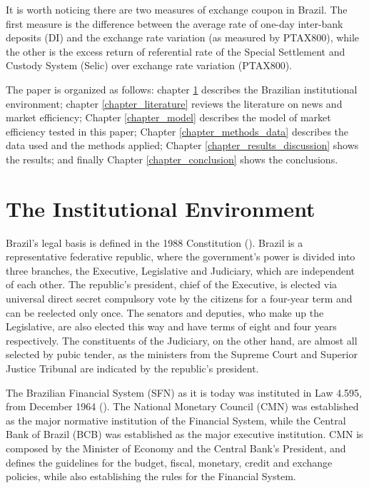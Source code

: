 \documentclass[cic,tc, english]{iiufrgs}
\begin{document}
    It is worth noticing there are two measures of exchange coupon in Brazil. The first measure is the difference between the average rate of one-day inter-bank deposits (DI) and the exchange rate variation (as measured by PTAX800), while the other is the excess return of referential rate of the Special Settlement and Custody System (Selic) over exchange rate variation (PTAX800). 
  
    The paper is organized as follows: chapter \ref{chapter_institutional} describes the Brazilian institutional environment; chapter \ref{chapter_literature} reviews the literature on news and market efficiency; Chapter \ref{chapter_model} describes the model of market efficiency tested in this paper; Chapter \ref{chapter_methods_data} describes the data used and the methods applied; Chapter \ref{chapter_results_discussion} shows the results; and finally Chapter \ref{chapter_conclusion} shows the conclusions.

\chapter{The Institutional Environment} \label{chapter_institutional}

    Brazil's legal basis is defined in the 1988 Constitution (\citet{constituicao}). Brazil is a representative federative republic, where the government's power is divided into three branches, the Executive, Legislative and Judiciary, which are independent of each other. The republic's president, chief of the Executive, is elected via universal direct secret compulsory vote by the citizens for a four-year term and can be reelected only once. The senators and deputies, who make up the Legislative, are also elected this way and have terms of eight and four years respectively. The constituents of the Judiciary, on the other hand, are almost all selected by pubic tender, as the ministers from the Supreme Court and Superior Justice Tribunal are indicated by the republic's president.

    The Brazilian Financial System (SFN) as it is today was instituted in Law 4.595, from December 1964 (\citet{lei4595}). The National Monetary Council (CMN) was established as the major normative institution of the Financial System, while the Central Bank of Brazil (BCB) was established as the major executive institution. CMN is composed by the Minister of Economy and the Central Bank's President, and defines the guidelines for the budget, fiscal, monetary, credit and exchange policies, while also establishing the rules for the Financial System.
\end{document}
